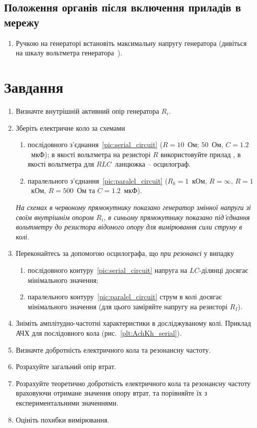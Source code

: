 \subsection*{Положення органів після включення приладів в мережу}

\begin{enumerate}
	\item Ручкою \circled{\ref{btn:regexit}}  на генераторі  встановіть максимальну напругу генератора (дивіться на шкалу вольтметра генератора~\circled{\ref{scale:Vscale}}).
\end{enumerate}

\section{Завдання}

\begin{enumerate}
	\item Визначте внутрішній активний опір генератора $R_i$.
	\item Зберіть електричне коло за схемами
	      \begin{enumerate}[label=\alph*)]
		      \item послідовного з'єднання~\ref{pic:serial_circuit} ($R = 10$~Ом; $50$~Ом, $C = 1.2$~мкФ); в якості вольтметра на резисторі $R$ використовуйте прилад , в якості вольтметра для $RLC$~ланцюжка -- осцилограф.
		      \item паралельного з'єднання~\ref{pic:paralel_circuit} ($R_k = 1$~кОм, $R = \infty$, $R = 1$~кОм, $R = 500$~Ом та $C = 1.2$~мкФ).
	      \end{enumerate}
	      {\small\itshape На схемах в червоному прямокутнику показано генератор змінної напруги зі своїм внутрішнім опором $R_i$, в синьому прямокутнику показано під'єднання вольтметру до резистора відомого опору для вимірювання сили струму в колі.}
	\item Переконайтесь за допомогою осцилографа, що \emph{при резонансі} у випадку
	      \begin{enumerate}[label=\alph*)]
		      \item послідовного контуру~\ref{pic:serial_circuit}  напруга на $LC$-ділянці досягає мінімального значення;
		      \item паралельного контуру~\ref{pic:paralel_circuit} струм в колі досягає мінімального значення (для цього заміряйте напругу на резисторі $R_I$).
	      \end{enumerate}
	\item Зніміть амплітудно-частотні характеристики в досліджуваному колі. Приклад АЧХ для послідовного кола (рис.~\ref{plt:AchKh_serial}).
	\item Визначте добротність електричного кола та резонансну частоту.
	\item Розрахуйте загальний опір втрат.
	\item Розрахуйте теоретично добротність електричного кола та резонансну частоту враховуючи отримане значення опору втрат, та порівняйте їх з експериментальними значеннями.
	\item Оцініть похибки вимірювання.
\end{enumerate}

